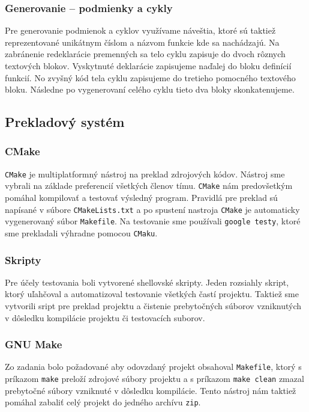 \documentclass[a4paper, 11pt]{article}
\begin{document}
    \subsubsection{Generovanie -- podmienky a cykly}
    Pre generovanie podmienok a cyklov využívame náveštia, ktoré sú taktiež reprezentované unikátnym číslom a
    názvom funkcie kde sa nachádzajú. Na zabránenie redeklarácie premenných sa telo cyklu zapisuje do dvoch rôznych textových
    blokov. Vyskytnuté deklarácie zapisujeme naďalej do bloku definícií funkcií. No zvyšný kód tela cyklu zapisujeme do
    tretieho pomocného textového bloku. Následne po vygenerovaní celého cyklu tieto dva bloky skonkatenujeme.

    \subsection{Prekladový systém}
    \subsubsection{CMake}
    \texttt{CMake} je multiplatformný nástroj na preklad zdrojových kódov. Nástroj sme vybrali na základe preferencií všetkých
    členov tímu. \texttt{CMake} nám predovšetkým pomáhal kompilovať a testovať výsledný program. Pravidlá pre preklad sú napísané v súbore
    \texttt{CMakeLists.txt} a po spustení nastroja \texttt{CMake} je automaticky vygenerovaný súbor \texttt{Makefile}.
    Na testovanie sme používali \texttt{google testy}, ktoré sme prekladali výhradne pomocou \texttt{CMaku}.

    \subsubsection{Skripty}
    Pre účely testovania boli vytvorené shellovské skripty. Jeden rozsiahly skript, ktorý uľahčoval a automatizoval
    testovanie všetkých častí projektu. Taktiež sme vytvorili sript pre preklad projektu a čistenie prebytočných súborov
    vzniknutých v dôsledku kompilácie projektu či testovacích suborov.

    \subsubsection{GNU Make}
    Zo zadania bolo požadované aby odovzdaný projekt obsahoval \texttt{Makefile}, ktorý s príkazom
    \texttt{make} preloží zdrojové súbory projektu a s príkazom \texttt{make clean} zmazal prebytočné súbory vzniknuté v dôsledku kompilácie.
    Tento nástroj nám taktiež pomáhal zabaliť celý projekt do jedného archívu \texttt{zip}.
\end{document}
